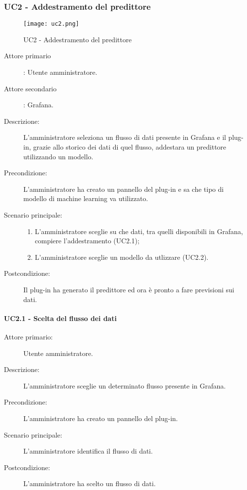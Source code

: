 \newpage
\subsubsection{UC2 - Addestramento del predittore}
\label{sssec:uc2}

\begin{figure}[h!]
  \begin{center}
    \texttt{[image: uc2.png]}\\
    \caption{UC2 - Addestramento del predittore}%
    \label{fig:uc2}
  \end{center}
\end{figure}

\begin{description}
  \item[Attore primario]: Utente amministratore.
  \item[Attore secondario]: Grafana.
  \item[Descrizione:] L'amministratore seleziona un flusso di dati presente in Grafana e il plug-in, grazie allo storico dei dati di quel flusso, addestara un predittore utilizzando un modello.
  \item[Precondizione:] L'amministratore ha creato un pannello del plug-in e sa che tipo di modello di machine learning va utilizzato.
  \item[Scenario principale:]
  \begin{enumerate}
    \item L'amministratore sceglie su che dati, tra quelli disponibili in Grafana, compiere l'addestramento (UC2.1);
    \item L'amministratore sceglie un modello da utlizzare (UC2.2).
  \end{enumerate}
  \item[Postcondizione:] Il plug-in ha generato il predittore ed ora è pronto a fare previsioni sui dati.
\end{description}

\paragraph{UC2.1 - Scelta del flusso dei dati}
\label{sssec:uc2.1}
\begin{description}
  \item[Attore primario:] Utente amministratore.
  \item[Descrizione:] L'amministratore sceglie un determinato flusso presente in Grafana.
  \item[Precondizione:] L'amministratore ha creato un pannello del plug-in.
  \item[Scenario principale:] L'amministratore identifica il flusso di dati.
  \item[Postcondizione:] L'amministratore ha scelto un flusso di dati.
\end{description}


